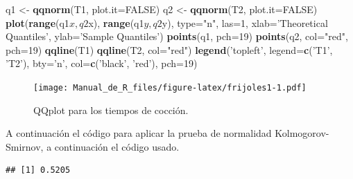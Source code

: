 \documentclass[10pt,]{krantz}
\makeatletter
\newenvironment{Shaded}{\begin{snugshade}}{\end{snugshade}}
\newcommand{\KeywordTok}[1]{\textcolor[rgb]{0.13,0.29,0.53}{\textbf{{#1}}}}
\newcommand{\DataTypeTok}[1]{\textcolor[rgb]{0.13,0.29,0.53}{{#1}}}
\newcommand{\DecValTok}[1]{\textcolor[rgb]{0.00,0.00,0.81}{{#1}}}
\newcommand{\StringTok}[1]{\textcolor[rgb]{0.31,0.60,0.02}{{#1}}}
\newcommand{\OtherTok}[1]{\textcolor[rgb]{0.56,0.35,0.01}{{#1}}}
\newcommand{\NormalTok}[1]{{#1}}
\newenvironment{kframe}{%
\medskip{}
\setlength{\fboxsep}{.8em}
 \def\at@end@of@kframe{}%
 \ifinner\ifhmode%
  \def\at@end@of@kframe{\end{minipage}}%
  \begin{minipage}{\columnwidth}%
 \fi\fi%
 \def\FrameCommand##1{\hskip\@totalleftmargin \hskip-\fboxsep
 \colorbox{shadecolor}{##1}\hskip-\fboxsep
     \hskip-\linewidth \hskip-\@totalleftmargin \hskip\columnwidth}%
 \MakeFramed {\advance\hsize-\width
   \@totalleftmargin\z@ \linewidth\hsize
   \@setminipage}}%
 {\par\unskip\endMakeFramed%
 \at@end@of@kframe}
\renewenvironment{Shaded}{\begin{kframe}}{\end{kframe}}
\makeatother
\begin{document}
\begin{Shaded}
\begin{Highlighting}[]
\NormalTok{q1 <-}\StringTok{ }\KeywordTok{qqnorm}\NormalTok{(T1, }\DataTypeTok{plot.it=}\OtherTok{FALSE}\NormalTok{)}
\NormalTok{q2 <-}\StringTok{ }\KeywordTok{qqnorm}\NormalTok{(T2, }\DataTypeTok{plot.it=}\OtherTok{FALSE}\NormalTok{)}
\KeywordTok{plot}\NormalTok{(}\KeywordTok{range}\NormalTok{(q1$x, q2$x), }\KeywordTok{range}\NormalTok{(q1$y, q2$y), }\DataTypeTok{type=}\StringTok{"n"}\NormalTok{, }\DataTypeTok{las=}\DecValTok{1}\NormalTok{,}
     \DataTypeTok{xlab=}\StringTok{'Theoretical Quantiles'}\NormalTok{, }\DataTypeTok{ylab=}\StringTok{'Sample Quantiles'}\NormalTok{)}
\KeywordTok{points}\NormalTok{(q1, }\DataTypeTok{pch=}\DecValTok{19}\NormalTok{)}
\KeywordTok{points}\NormalTok{(q2, }\DataTypeTok{col=}\StringTok{"red"}\NormalTok{, }\DataTypeTok{pch=}\DecValTok{19}\NormalTok{)}
\KeywordTok{qqline}\NormalTok{(T1)}
\KeywordTok{qqline}\NormalTok{(T2, }\DataTypeTok{col=}\StringTok{"red"}\NormalTok{)}
\KeywordTok{legend}\NormalTok{(}\StringTok{'topleft'}\NormalTok{, }\DataTypeTok{legend=}\KeywordTok{c}\NormalTok{(}\StringTok{'T1'}\NormalTok{, }\StringTok{'T2'}\NormalTok{), }\DataTypeTok{bty=}\StringTok{'n'}\NormalTok{,}
       \DataTypeTok{col=}\KeywordTok{c}\NormalTok{(}\StringTok{'black'}\NormalTok{, }\StringTok{'red'}\NormalTok{), }\DataTypeTok{pch=}\DecValTok{19}\NormalTok{)}
\end{Highlighting}
\end{Shaded}

\begin{figure}[htbp]
\centering
\texttt{[image: Manual\_de\_R\_files/figure-latex/frijoles1-1.pdf]}
\caption{\label{fig:frijoles1}QQplot para los tiempos de cocción.}
\end{figure}

A continuación el código para aplicar la prueba de normalidad
Kolmogorov-Smirnov, a continuación el código usado.

\begin{Shaded}
\end{Shaded}

\begin{verbatim}
## [1] 0.5205
\end{verbatim}

\begin{Shaded}
\end{Shaded}
\end{document}
